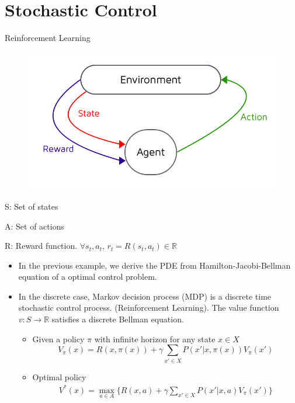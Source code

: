 \documentclass{beamer}
\begin{document}
\section{Stochastic Control}


\begin{frame}{Reinforcement Learning}
\begin{figure}
\includegraphics[scale = 0.5]{reinforcementlearning}
\end{figure}
S: Set of states

A: Set of actions

R: Reward function. $\forall s_t,a_t$, $r_t = R(s_t,a_t)\in \mathbb{R}$

  
\end{frame}


\begin{frame}
\begin{itemize}
\item In the previous example, we derive the PDE from {\color{red}Hamilton-Jacobi-Bellman} equation of a optimal control problem. 
\pause
\item In the discrete case, Markov decision process (MDP) is a discrete time stochastic control process. (Reinforcement Learning).   The value function $v:S\to \mathbb{R}$ satisfies a discrete Bellman equation.
\pause
\begin{itemize}
\item Given a policy $\pi$ with infinite horizon for any state $x\in X$
\begin{equation*}
V_\pi(x) = R(x,\pi(x)) + \gamma\sum_{x'\in X}P(x'|x,\pi(x))V_{\pi}(x')
\end{equation*}
\item Optimal policy
\begin{align*}
V^\ast(x) = \max_{a\in A}\{R(x,a) + \gamma\sum_{x'\in X}P(x'|x,a)V_{\pi}(x')\}
\end{align*}
\end{itemize}

\end{itemize} 
\end{frame}
\end{document}

